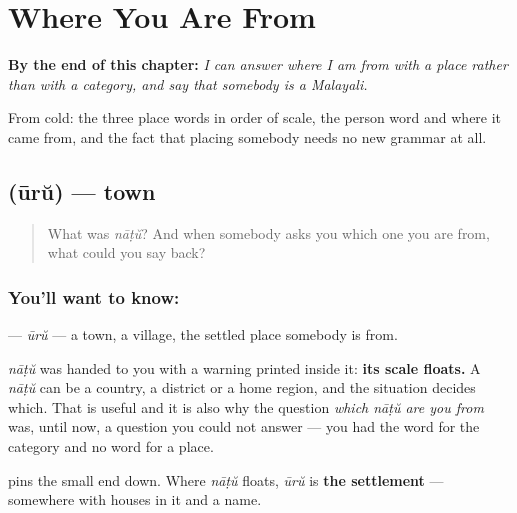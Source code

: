 
\chapter{Where You Are From}
\label{ch:ml-origin}

\begin{chapteropening}
\textbf{By the end of this chapter:} \emph{I can answer where I am from with a place rather than with a category, and say that somebody is a Malayali.}

From cold: the three place words in order of scale, the person word and where it came from, and the fact that placing somebody needs no new grammar at all.
\end{chapteropening}

\section[\texorpdfstring{\ml{ഊര്} (ūrŭ)}{ഊര് (ūrŭ)}]{ (ūrŭ) — town}

\label{lesson:ML-C80-uuru}



\begin{quote}
What was \emph{nāṭŭ}? And when somebody asks you which one you are from, what could you say back?
\end{quote}

\subsection*{You'll want to know: }
\textbf{} — \emph{ūrŭ} — a town, a village, the settled place somebody is from.

\emph{nāṭŭ} was handed to you with a warning printed inside it: \textbf{its scale floats.} A \emph{nāṭŭ} can be a country, a district or a home region, and the situation decides which. That is useful and it is also why the question \emph{which nāṭŭ are you from} was, until now, a question you could not answer — you had the word for the category and no word for a place.

\textbf{} pins the small end down. Where \emph{nāṭŭ} floats, \emph{ūrŭ} is \textbf{the settlement} — somewhere with houses in it and a name.

